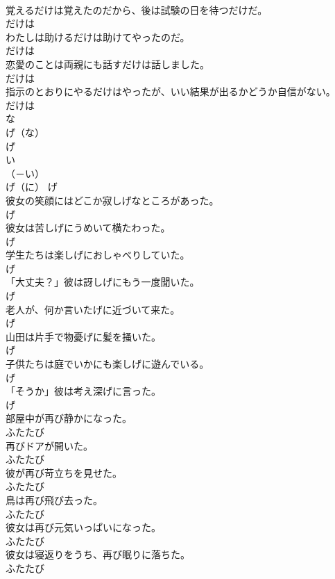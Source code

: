 \documentclass[8pt]{extreport}
\begin{document}
\begin{CJK}{UTF8}{min}
\\	覚えるだけは覚えたのだから、後は試験の日を待つだけだ。	
\\	だけは
\\	わたしは助けるだけは助けてやったのだ。	
\\	だけは
\\	恋愛のことは両親にも話すだけは話しました。	
\\	だけは
\\	指示のとおりにやるだけはやったが、いい結果が出るかどうか自信がない。	
\\	だけは
\\	な
\\	げ（な）	
\\	げ	
\\	い
\\	（－い） 
\\	げ（に）	げ
\\	彼女の笑顔にはどこか寂しげなところがあった。	
\\	げ
\\	彼女は苦しげにうめいて横たわった。	
\\	げ
\\	学生たちは楽しげにおしゃべりしていた。	
\\	げ
\\	「大丈夫？」彼は訝しげにもう一度聞いた。	
\\	げ
\\	老人が、何か言いたげに近づいて来た。	
\\	げ
\\	山田は片手で物憂げに髪を掻いた。	
\\	げ
\\	子供たちは庭でいかにも楽しげに遊んでいる。	
\\	げ
\\	「そうか」彼は考え深げに言った。	
\\	げ
\\	部屋中が再び静かになった。	
\\	ふたたび
\\	再びドアが開いた。	
\\	ふたたび
\\	彼が再び苛立ちを見せた。	
\\	ふたたび
\\	鳥は再び飛び去った。	
\\	ふたたび
\\	彼女は再び元気いっぱいになった。	
\\	ふたたび
\\	彼女は寝返りをうち、再び眠りに落ちた。	
\\	ふたたび

\end{CJK}
\end{document}
